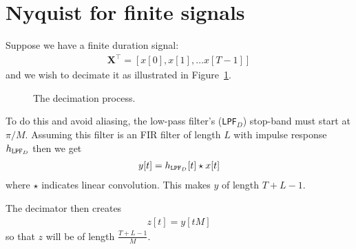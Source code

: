 \documentclass[11pt]{article}
\newcommand{\bX}{\mathbf{X}}
\begin{document}
\section{Nyquist for finite signals}

Suppose we have a finite duration signal:
\begin{align}
\bX^\top = \left [x[0], x[1], \ldots x[T-1] \right]
\end{align}
and we wish to decimate it as illustrated in Figure~\ref{fig:decimation}.

% 
% 

\begin{figure}[h]
\begin{center}
  
 \caption{The decimation process.}\label{fig:decimation}
 \end{center}
  \end{figure}
  
  To do this and avoid aliasing, the low-pass filter's ({\tt LPF}$_D$) stop-band must start at $\pi/M$. Assuming this filter is an FIR filter of length $L$ with impulse response $h_{{\tt LPF}_D}$ then we get
  \begin{align}
  y[t] = h_{{\tt LPF}_D}[t] \star x[t]
  \end{align}
  where $\star$ indicates linear convolution.  This makes $y$ of length $T + L - 1$.
  
  The decimator then creates
  \begin{align}
  z[t] = y[tM]
  \end{align}
  so that $z$ will be of length $\frac{T + L - 1}{M}$.
\end{document}
